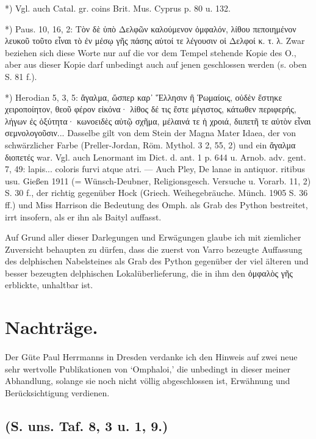 \documentclass[a4paper, 11pt, oneside]{article}
\begin{document}
*) Vgl. auch Catal. gr. coins Brit. Mus. Cyprus p. 80 u. 132.

*) Paus. 10, 16, 2: Τὸν δὲ ὑπὸ Δελφῶν καλούμενον ὀμφαλόν, λίθου πεποιημένον λευκοῦ τοῦτο εἶναι τὸ ἐν μέσῳ γῆς πάσης αὐτοί τε λέγουσιν οἱ Δελφοί κ. τ. λ. Zwar beziehen sich diese Worte nur auf die vor dem Tempel stehende Kopie des O., aber aus dieser Kopie darf unbedingt auch auf jenen geschlossen werden (s. oben S. 81 f.).

*) Herodian 5, 3, 5: ἄγαλμα, ὥσπερ καρ᾽ Ἕλλησιν ἢ Ῥωμαίοις, οὐδὲν ἕστηκε χειροποίητον, θεοῦ φέρον εἰκόνα· λίθος δέ τις ἔστε μέγιστος, κάτωθεν περιφερής, λήγων ἐς ὀξύτητα· κωνοειδὲς αὐτῷ σχῆμα, μέλαινά τε ἡ χροιά, διιπετῆ τε αὐτὸν εἶναι σεμνολογοῦσιν... Dasselbe gilt von dem Stein der Magna Mater Idaea, der von schwärzlicher Farbe (Preller-Jordan, Röm. Mythol. 3 2, 55, 2) und ein ἄγαλμα διοπετές war. Vgl. auch Lenormant im Dict. d. ant. 1 p. 644 u. Arnob. adv. gent. 7, 49: lapis... coloris furvi atque atri. --- Auch Pley, De lanae in antiquor. ritibus usu. Gießen 1911 (= Wünsch-Deubner, Religionsgesch. Versuche u. Vorarb. 11, 2) S. 30 f., der richtig gegenüber Hock (Griech. Weihegebräuche. Münch. 1905 S. 36 ff.) und Miss Harrison die Bedeutung des Omph. als Grab des Python bestreitet, irrt insofern, als er ihn als Baityl auffasst.

Auf Grund aller dieser Darlegungen und Erwägungen glaube ich mit ziemlicher Zuversicht behaupten zu dürfen, dass die zuerst von Varro bezeugte Auffassung des delphischen Nabelsteines als Grab des Python gegenüber der viel älteren und besser bezeugten delphischen Lokalüberlieferung, die in ihm den ὀμφαλὸς γῆς erblickte, unhaltbar ist.
\clearpage
\section{Nachträge.}
\paragraph{}
Der Güte Paul Herrmanns in Dresden verdanke ich den Hinweis auf zwei neue sehr wertvolle Publikationen von `Omphaloi,' die unbedingt in dieser meiner Abhandlung, solange sie noch nicht völlig abgeschlossen ist, Erwähnung und Berücksichtigung verdienen.

\subsection{(S. uns. Taf. 8, 3 u. 1, 9.)}
\end{document}
